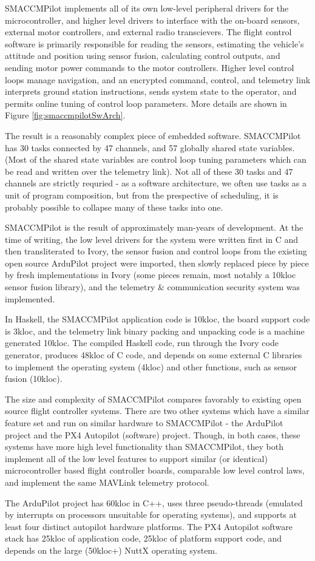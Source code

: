 SMACCMPilot implements all of its own low-level peripheral drivers for the
microcontroller, and higher level drivers to interface with the on-board
sensors, external motor controllers, and external radio transcievers. The flight
control software is primarily responsible for reading the sensors, estimating
the vehicle's attitude and position using sensor fusion, calculating control
outputs, and sending motor power commands to the motor controllers.  Higher
level control loops manage navigation, and an encrypted command, control, and
telemetry link interprets ground station instructions, sends system state to the
operator, and permits online tuning of control loop parameters. More details are
shown in Figure \ref{fig:smaccmpilotSwArch}.

The result is a reasonably complex piece of embedded software.  SMACCMPilot has
30 tasks connected by 47 channels, and 57 globally shared state variables. (Most
of the shared state variables are control loop tuning parameters which can be
read and written over the telemetry link). Not all of these 30 tasks and 47
channels are strictly requried - as a software architecture, we often use tasks
as a unit of program composition, but from the prespective of scheduling, it is
probably possible to collapse many of these tasks into one.

SMACCMPilot is the result of approximately  man-years of development. At the
time of writing, the low level drivers for the system were written first in C
and then transliterated to Ivory, the sensor fusion and control loops from the
existing open source ArduPilot project were imported, then slowly replaced piece
by piece by fresh implementations in Ivory (some pieces remain, most notably a
10kloc sensor fusion library), and the telemetry \& communication security
system was implemented.

In Haskell, the SMACCMPilot application code is 10kloc, the board support code
is 3kloc, and the telemetry link binary packing and unpacking code is a machine
generated 10kloc. The compiled Haskell code, run through the Ivory code
generator, produces 48kloc of C code, and depends on some external C libraries
to implement the operating system (4kloc) and other functions, such as sensor
fusion (10kloc).

The size and complexity of SMACCMPilot compares favorably to existing open
source flight controller systems. There are two other systems which have a
similar feature set and run on similar hardware to SMACCMPilot - the ArduPilot
project and the PX4 Autopilot (software) project. Though, in both cases, these
systems have more high level functionality than SMACCMPilot, they both implement
all of the low level features to support similar (or identical) microcontroller
based flight controller boards, comparable low level control laws, and implement
the same MAVLink telemetry protocol.

The ArduPilot project has 60kloc in C++, uses three pseudo-threads (emulated by
interrupts on processors unsuitable for operating systems), and supports at
least four distinct autopilot hardware platforms. The PX4 Autopilot software
stack has 25kloc of application code, 25kloc of platform support code, and
depends on the large (50kloc+) NuttX operating system.


